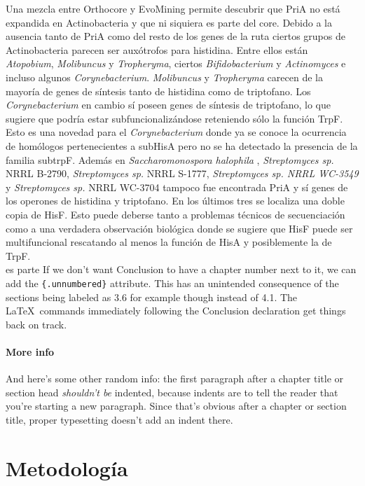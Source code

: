 \documentclass[12pt,twoside]{reedthesis}
\begin{document}
  Una mezcla entre Orthocore y EvoMining permite descubrir que PriA no
  está expandida en Actinobacteria y que ni siquiera es parte del core.
  Debido a la ausencia tanto de PriA como del resto de los genes de la
  ruta ciertos grupos de Actinobacteria parecen ser auxótrofos para
  histidina. Entre ellos están \emph{Atopobium}, \emph{Molibuncus} y
  \emph{Tropheryma}, ciertos \emph{Bifidobacterium} y \emph{Actinomyces} e
  incluso algunos \emph{Corynebacterium}. \emph{Molibuncus} y
  \emph{Tropheryma} carecen de la mayoría de genes de síntesis tanto de
  histidina como de triptofano. Los \emph{Corynebacterium} en cambio sí
  poseen genes de síntesis de triptofano, lo que sugiere que podría estar
  subfuncionalizándose reteniendo sólo la función TrpF. Esto es una
  novedad para el \emph{Corynebacterium} donde ya se conoce la ocurrencia
  de homólogos pertenecientes a subHisA pero no se ha detectado la
  presencia de la familia subtrpF. Además en \emph{Saccharomonospora
  halophila} , \emph{Streptomyces sp.} NRRL B-2790, \emph{Streptomyces
  sp.} NRRL S-1777, \emph{Streptomyces sp. NRRL WC-3549} y
  \emph{Streptomyces sp.} NRRL WC-3704 tampoco fue encontrada PriA y sí
  genes de los operones de histidina y triptofano. En los últimos tres se
  localiza una doble copia de HisF. Esto puede deberse tanto a problemas
  técnicos de secuenciación como a una verdadera observación biológica
  donde se sugiere que HisF puede ser multifuncional rescatando al menos
  la función de HisA y posiblemente la de TrpF.\\
  es parte If we don't want Conclusion to have a chapter number next to
  it, we can add the \texttt{\{.unnumbered\}} attribute. This has an
  unintended consequence of the sections being labeled as 3.6 for example
  though instead of 4.1. The \LaTeX~commands immediately following the
  Conclusion declaration get things back on track.
  
  \subsubsection{More info}\label{more-info}
  
  And here's some other random info: the first paragraph after a chapter
  title or section head \emph{shouldn't be} indented, because indents are
  to tell the reader that you're starting a new paragraph. Since that's
  obvious after a chapter or section title, proper typesetting doesn't add
  an indent there.
  
  \chapter{Metodología}\label{metodologia}
  
\end{document}
